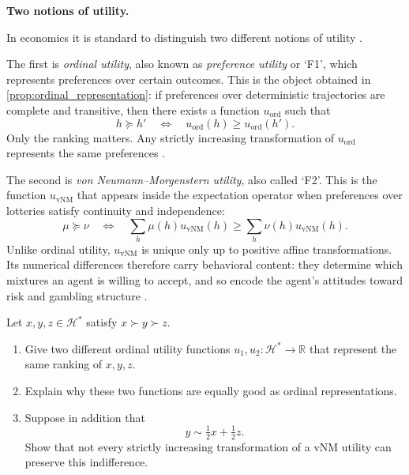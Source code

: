 \documentclass[11pt]{article}
\newcommand{\Hcal}{\mathcal{H}}
\newcommand{\R}{\mathbb{R}}
\newcommand{\pref}{\succcurlyeq}
\newcommand{\strictpref}{\succ}
\newcommand{\indiff}{\sim}
\begin{document}
\medskip
\begin{callout}
\textbf{Two notions of utility.}

In economics it is standard to distinguish two different notions of utility
\citep{kreps1988notes,mascolell1995micro}.

The first is \emph{ordinal utility}, also known as \emph{preference utility} or
`F1', which represents preferences over certain outcomes. This is the object
obtained in \cref{prop:ordinal_representation}: if preferences over
deterministic trajectories are complete and transitive, then there exists a
function $u_{\mathrm{ord}}$ such that
\[
h\pref h'
\quad\Longleftrightarrow\quad
u_{\mathrm{ord}}(h)\geq u_{\mathrm{ord}}(h').
\]
Only the ranking matters. Any strictly increasing transformation of
$u_{\mathrm{ord}}$ represents the same preferences \citep{fishburn1970utility}.

The second is \emph{von Neumann--Morgenstern utility}, also called `F2'. This is the function
$u_{\mathrm{vNM}}$ that appears inside the expectation operator when
preferences over lotteries satisfy continuity and independence:
\[
\mu\pref\nu
\quad\Longleftrightarrow\quad
\sum_h \mu(h)u_{\mathrm{vNM}}(h)\geq \sum_h \nu(h)u_{\mathrm{vNM}}(h).
\]
Unlike ordinal utility, $u_{\mathrm{vNM}}$ is unique only up to positive affine
transformations. Its numerical differences therefore carry behavioral content:
they determine which mixtures an agent is willing to accept, and so encode the
agent's attitudes toward risk and gambling structure
\citep{vonneumann1944theory,mascolell1995micro}.

\end{callout}
\medskip


\begin{exercise}
\label{ex:ordinal-vs-vnm}
Let $x,y,z\in\Hcal^*$ satisfy $x\strictpref y\strictpref z$.
\begin{enumerate}[label=(\alph*)]
\item Give two different ordinal utility functions $u_1,u_2\colon\Hcal^*\to\R$
that represent the same ranking of $x,y,z$.
\item Explain why these two functions are equally good as ordinal
representations.
\item Suppose in addition that
\[
y \indiff \tfrac12 x + \tfrac12 z.
\]
Show that not every strictly increasing transformation of a vNM utility can
preserve this indifference.
\end{enumerate}
\end{exercise}
\end{document}
